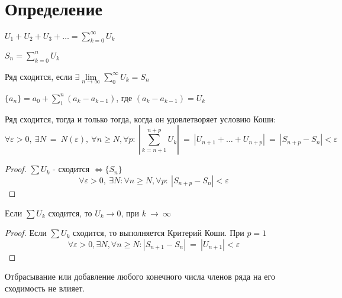 \section{Определение}

\begin{definition}
  $U_1 + U_2 + U_3 + \dots = \sum\limits_{k = 0}^{\infty}{U_k}$
\end{definition}

\begin{definition}
  $S_n = \sum\limits_{k = 0}^n U_k$
\end{definition}

\begin{definition}
  Ряд сходится, если $\exists \lim\limits_{n \to \infty}
                      \sum\limits_0^\infty U_k = S_n$
\end{definition}

\begin{definition}
  $\{a_n\} = a_0 + \sum\limits_1^n (a_k - a_{k-1})$, где $(a_k - a_{k - 1}) = U_k$
\end{definition}

\begin{theorem}
  \label{th111}
  Ряд сходится, тогда и только тогда, когда он удовлетворяет условию Коши: \\
  $$\forall \varepsilon > 0, \ \exists N~=~N(\varepsilon), \
  \forall n \geq N, \forall p: \ |\sum\limits_{k=n+1}^{n+p} U_k|~=~|U_{n+1}
  + \dots + U_{n+p}|~=~|S_{n+p} - S_{n}| < \varepsilon$$
\end{theorem}

\begin{proof}
  $\sum U_k$ - сходится $\Leftrightarrow \{S_n\}$
  $$\forall \varepsilon > 0, \ \exists N: \forall n \geq N, \forall p: \
  |S_{n+p} - S_{n}| < \varepsilon$$
\end{proof}
\begin{consequence}
  Если $\sum U_k$ сходится, то $U_k \to 0$, при $k~\to~\infty$
\end{consequence}
\begin{proof}
  Если $\sum U_k$ сходится, то выполняется Критерий Коши. При $p = 1$
  $$\forall \varepsilon > 0, \exists N, \forall n \geq N:
  |S_{n+1} - S_n|~=~|U_{n+1}| < \varepsilon$$
\end{proof}
\begin{consequence}
  Отбрасывание или добавление любого конечного числа членов ряда на его
  сходимость не влияет.
\end{consequence}

